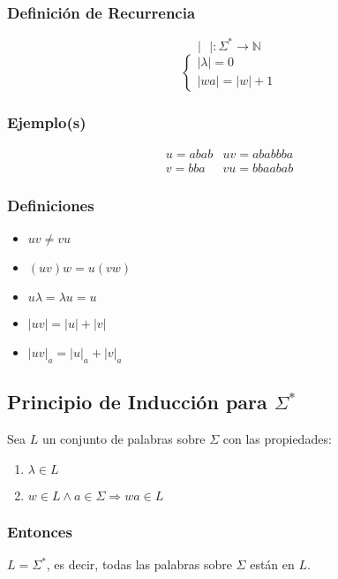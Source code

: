 \subsubsection{Definición de Recurrencia}
$$|\text{ }|:\Sigma^*\rightarrow\mathbb{N}$$
$$
\begin{cases}
|\lambda |=0 \\
|wa| = |w| + 1
\end{cases}
$$
\subsubsection{Ejemplo(s)}
\begin{align*}
u=abab & uv=ababbba \\
v=bba  & vu=bbaabab
\end{align*}
\subsubsection{Definiciones}
\begin{itemize}
\item $uv\neq vu$
\item $(uv)w=u(vw)$
\item $u\lambda=\lambda u=u$
\item $|uv|=|u|+|v|$
\item $|uv|_a = |u|_a + |v|_a$
\end{itemize}
\subsection{Principio de Inducción para $\Sigma^*$}
Sea $L$ un conjunto de palabras sobre $\Sigma$ con las propiedades:
\renewcommand{\labelenumi}{\theenumi}
\renewcommand{\theenumi}{\textbf{\roman{enumi}.)}}%
\begin{enumerate}
\item $\lambda \in L$
\item $w\in L \wedge a\in\Sigma \Rightarrow wa \in L$
\end{enumerate}
\subsubsection{Entonces}
$L=\Sigma^*$, es decir, todas las palabras sobre $\Sigma$ están en $L$.